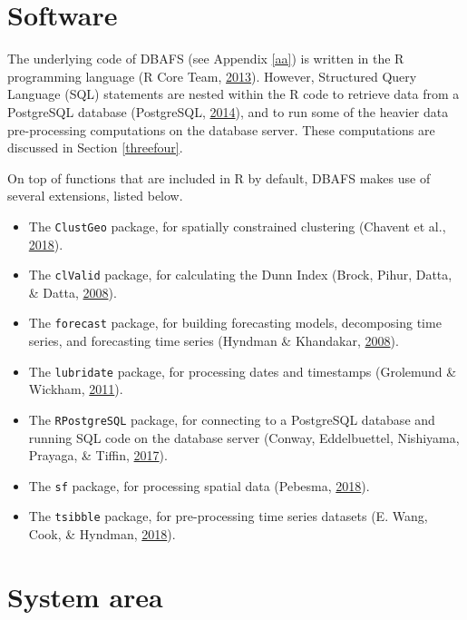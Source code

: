 \documentclass[12pt,oneside]{reedthesis}
\providecommand{\tightlist}{%
  \setlength{\itemsep}{0pt}\setlength{\parskip}{0pt}}
\begin{document}
\section{Software}\label{threetwo}

The underlying code of DBAFS (see Appendix \ref{aa}) is written in the R
programming language (R Core Team,
\protect\hyperlink{ref-rlanguage}{2013}). However, Structured Query
Language (SQL) statements are nested within the R code to retrieve data
from a PostgreSQL database (PostgreSQL,
\protect\hyperlink{ref-postgres}{2014}), and to run some of the heavier
data pre-processing computations on the database server. These
computations are discussed in Section \ref{threefour}.

On top of functions that are included in R by default, DBAFS makes use
of several extensions, listed below.
\begin{itemize}
\tightlist
\item
  The \texttt{ClustGeo} package, for spatially constrained clustering
  (Chavent et al., \protect\hyperlink{ref-clustgeo}{2018}).
\item
  The \texttt{clValid} package, for calculating the Dunn Index (Brock,
  Pihur, Datta, \& Datta, \protect\hyperlink{ref-clValid}{2008}).
\item
  The \texttt{forecast} package, for building forecasting models,
  decomposing time series, and forecasting time series (Hyndman \&
  Khandakar, \protect\hyperlink{ref-forecast}{2008}).
\item
  The \texttt{lubridate} package, for processing dates and timestamps
  (Grolemund \& Wickham, \protect\hyperlink{ref-lubridate}{2011}).
\item
  The \texttt{RPostgreSQL} package, for connecting to a PostgreSQL
  database and running SQL code on the database server (Conway,
  Eddelbuettel, Nishiyama, Prayaga, \& Tiffin,
  \protect\hyperlink{ref-RPostgreSQL}{2017}).
\item
  The \texttt{sf} package, for processing spatial data (Pebesma,
  \protect\hyperlink{ref-sf}{2018}).
\item
  The \texttt{tsibble} package, for pre-processing time series datasets
  (E. Wang, Cook, \& Hyndman, \protect\hyperlink{ref-tsibble}{2018}).
\end{itemize}
\section{System area}\label{threethree}
\end{document}
